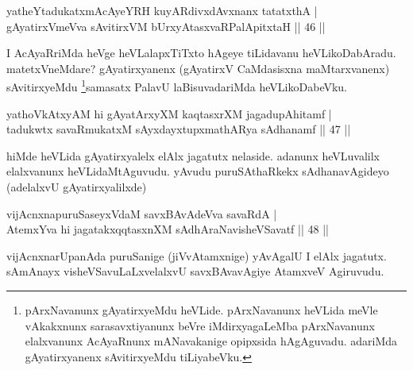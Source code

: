
\begin{shl}
yatheYtadukatxmAcAyeYRH kuyARdivxdAvxnanx\footnotemark[2]{} tatatxthA | \\
gAyatirxVmeVva sAvitirxVM bUrxyAtasxvaRPalApitxtaH \hfill ||  46 || 
\end{shl}

\begin{artha} 
I AcAyaRriMda heVge heVLalapxTiTxto hAgeye tiLidavanu heVLikoDabAradu. 
matetxVneMdare? gAyatirxyanenx (gAyatirxV CaMdasisxna maMtarxvanenx) 
sAvitirxyeMdu \footnote[2]{pArxNavanunx gAyatirxyeMdu heVLide. 
pArxNavanunx heVLida meVle vAkakxnunx sarasavxtiyanunx beVre 
iMdirxyagaLeMba pArxNavanunx elalxvanunx AcAyaRnunx mANavakanige 
opipxsida hAgAguvadu. adariMda gAyatirxyanenx sAvitirxyeMdu 
tiLiyabeVku.}samasatx PalavU laBisuvadariMda 
heVLikoDabeVku.
\end{artha}


\begin{shl}
yathoVkAtxyAM hi gAyatArxyXM kaqtasxrXM jagadupAhitamf | \\
tadukwtx savaRmukatxM sAyxdayxtupxmathARya sAdhanamf \hfill ||  47 || 
\end{shl}

\begin{artha} 
hiMde heVLida gAyatirxyalelx elAlx jagatutx nelaside. adanunx 
heVLuvalilx elalxvanunx heVLidaMtAguvudu. yAvudu puruSAthaRkekx 
sAdhanavAgideyo (adelalxvU gAyatirxyalilxde)
\end{artha}


\begin{shl}
vijAcnxnapuruSaseyxVdaM savxBAvAdeVva savaRdA | \\
AtemxYva hi jagatakxqqtasxnXM sAdhAraNavisheVSavatf \hfill ||  48 ||
\end{shl}

\begin{artha} 
vijAcnxnarUpanAda puruSanige (jiVvAtamxnige) yAvAgalU I elAlx 
jagatutx. sAmAnayx visheVSavuLaLxvelalxvU savxBAvavAgiye AtamxveV 
Agiruvudu.
\end{artha}

